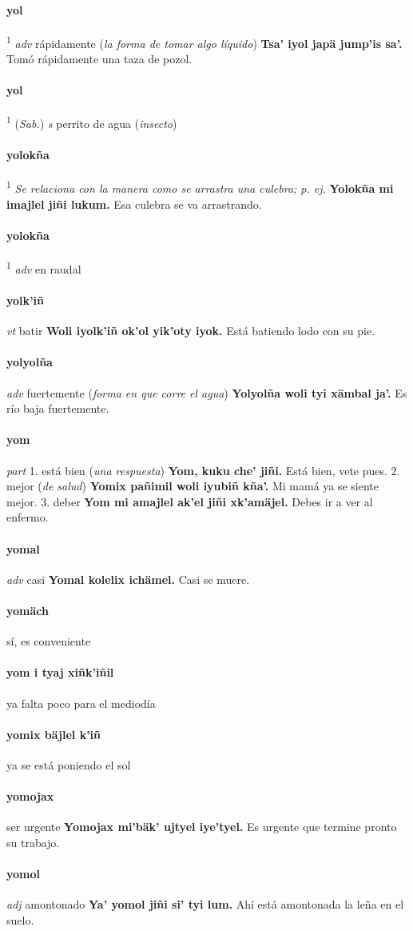 \documentclass{scrbook}
\newcommand{\entry}[1]{\paragraph{#1}}
\newcommand{\onedefinition}[1]{#1.}
\newcommand{\defsuperscript}[1]{\textsuperscript{1}}
\newcommand{\nontranslationdef}[1]{\textit{#1}}
\newcommand{\partofspeech}[1]{\textit{#1}}
\newcommand{\spanishtranslation}[1]{#1}
\newcommand{\clarification}[1]{(\textit{#1})}
\newcommand{\cholexample}[1]{\textbf{#1}}
\newcommand{\exampletranslation}[1]{#1}
\newcommand{\relevantdialect}[1]{(\textit{#1})}
\begin{document}
\begin{multicols}{2}
\entry{yol}
\defsuperscript{1}
\partofspeech{adv}
\spanishtranslation{rápidamente}
\clarification{la forma de tomar algo líquido}
\cholexample{Tsa' iyol japä jump'is sa'.}
\exampletranslation{Tomó rápidamente una taza de pozol.}

\entry{yol}
\defsuperscript{2}
\relevantdialect{Sab.}
\partofspeech{s}
\spanishtranslation{perrito de agua}
\clarification{insecto}

\entry{yolokña}
\defsuperscript{2}
\nontranslationdef{Se relaciona con la manera como se arrastra una culebra; p. ej.}
\cholexample{Yolokña mi imajlel jiñi lukum.}
\exampletranslation{Esa culebra se va arrastrando.}

\entry{yolokña}
\defsuperscript{1}
\partofspeech{adv}
\spanishtranslation{en raudal}

\entry{yolk'iñ}
\partofspeech{vt}
\spanishtranslation{batir}
\cholexample{Woli iyolk'iñ ok'ol yik'oty iyok.}
\exampletranslation{Está batiendo lodo con su pie.}

\entry{yolyolña}
\partofspeech{adv}
\spanishtranslation{fuertemente}
\clarification{forma en que corre el agua}
\cholexample{Yolyolña woli tyi xämbal ja'.}
\exampletranslation{Es río baja fuertemente.}

\entry{yom}
\partofspeech{part}
\onedefinition{1}
\spanishtranslation{está bien}
\clarification{una respuesta}
\cholexample{Yom, kuku che' jiñi.}
\exampletranslation{Está bien, vete pues.}
\onedefinition{2}
\spanishtranslation{mejor}
\clarification{de salud}
\cholexample{Yomix pañimil woli iyubiñ kña'.}
\exampletranslation{Mi mamá ya se siente mejor.}
\onedefinition{3}
\spanishtranslation{deber}
\cholexample{Yom mi amajlel ak'el jiñi xk'amäjel.}
\exampletranslation{Debes ir a ver al enfermo.}

\entry{yomal}
\partofspeech{adv}
\spanishtranslation{casi}
\cholexample{Yomal kolelix ichämel.}
\exampletranslation{Casi se muere.}

\entry{yomäch}
\spanishtranslation{sí, es conveniente}

\entry{yom i tyaj xiñk'iñil}
\spanishtranslation{ya falta poco para el mediodía}

\entry{yomix bäjlel k'iñ}
\spanishtranslation{ya se está poniendo el sol}

\entry{yomojax}
\spanishtranslation{ser urgente}
\cholexample{Yomojax mi'bäk' ujtyel iye'tyel.}
\exampletranslation{Es urgente que termine pronto su trabajo.}

\entry{yomol}
\partofspeech{adj}
\spanishtranslation{amontonado}
\cholexample{Ya' yomol jiñi si' tyi lum.}
\exampletranslation{Ahí está amontonada la leña en el suelo.}


\end{multicols}
\end{document}
